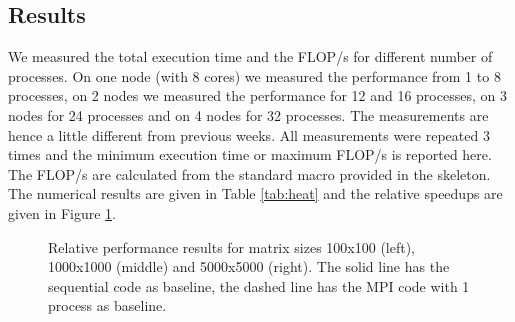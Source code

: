 \documentclass[11pt,a4paper,onecolumn]{article}
\begin{document}
\subsection{Results}
We measured the total execution time and the FLOP/s for different number of processes. On one node (with 8 cores) we measured the performance from 1 to 8 processes, on 2 nodes we measured the performance for 12 and 16 processes, on 3 nodes for 24 processes and on 4 nodes for 32 processes. The measurements are hence a little different from previous weeks. All measurements were repeated 3 times and the minimum execution time or maximum FLOP/s is reported here. The FLOP/s are calculated from the standard macro provided in the skeleton. The numerical results are given in Table \ref{tab:heat} and the relative speedups are given in Figure \ref{fig:heat}.
 
\begin{figure}[H]
 \centering
  \caption{Relative performance results for matrix sizes 100x100 (left), 1000x1000 (middle) and 5000x5000 (right). The solid line has the sequential code as baseline, the dashed line has the MPI code with 1 process as baseline.}
  \label{fig:heat}
\end{figure}
\end{document}
